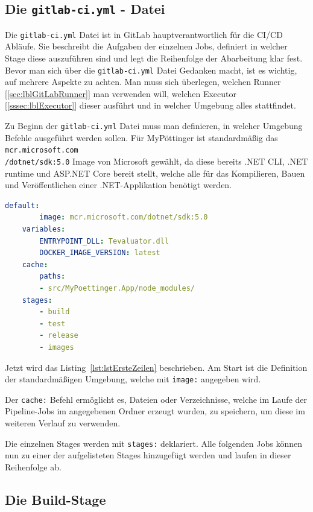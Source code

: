 \subsection{Die {\texttt{gitlab-ci.yml}} - Datei }

Die \texttt{gitlab-ci.yml} Datei ist in GitLab hauptverantwortlich für die CI/CD Abläufe. Sie beschreibt die Aufgaben der einzelnen Jobs, definiert in welcher Stage diese auszuführen sind und legt die Reihenfolge der Abarbeitung klar fest. Bevor man sich über die \texttt{gitlab-ci.yml} Datei Gedanken macht, ist es wichtig, auf mehrere Aspekte zu achten. Man muss sich überlegen, welchen Runner [\ref{sec:lblGitLabRunner}] man verwenden will, welchen Executor [\ref{sssec:lblExecutor}] dieser ausführt und in welcher Umgebung alles stattfindet.

Zu Beginn der \texttt{gitlab-ci.yml} Datei muss man definieren, in welcher Umgebung Befehle ausgeführt werden sollen. Für MyPöttinger ist standardmäßig das \texttt{mcr.microsoft.com\\/dotnet/sdk:5.0} Image von Microsoft gewählt, da diese bereits .NET CLI, .NET runtime und ASP.NET Core bereit stellt, welche alle für das Kompilieren, Bauen und Veröffentlichen einer .NET-Applikation benötigt werden.

\begin{lstlisting}[caption={Erste Zeilen der gitlab-ci.yml Datei}, language=yaml, label={lst:lstErsteZeilen}]
	default:
		image: mcr.microsoft.com/dotnet/sdk:5.0
	variables:
		ENTRYPOINT_DLL: Tevaluator.dll
		DOCKER_IMAGE_VERSION: latest
	cache:
		paths:
		- src/MyPoettinger.App/node_modules/
	stages:
		- build
		- test
		- release
		- images
\end{lstlisting}

Jetzt wird das Listing~\ref{lst:lstErsteZeilen} beschrieben. Am Start ist die Definition der standardmäßigen Umgebung, welche mit \texttt{image:} angegeben wird. 

Der \texttt{cache:} Befehl ermöglicht es, Dateien oder Verzeichnisse, welche im Laufe der Pipeline-Jobs im angegebenen Ordner erzeugt wurden, zu speichern, um diese im weiteren Verlauf zu verwenden.

Die einzelnen Stages werden mit \texttt{stages:} deklariert. Alle folgenden Jobs können nun zu einer der aufgelisteten Stages hinzugefügt werden und laufen in dieser Reihenfolge ab.

\subsection{Die Build-Stage}\label{sssec:lblBuildStage}

